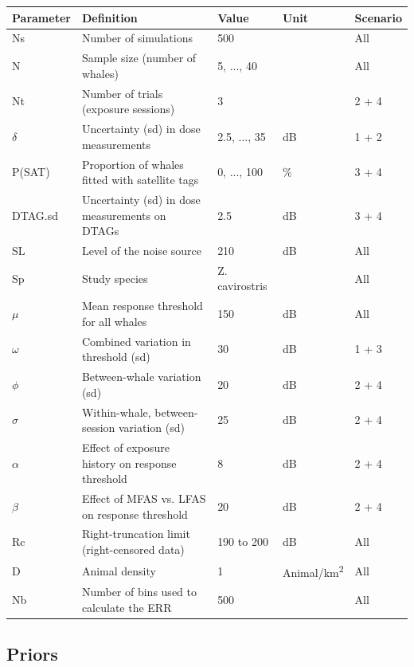 \documentclass[
]{article}
\begin{document}
\renewcommand{\arraystretch}{1.5}
\begin{table}[H]
\centering
\begin{tabular}{lllll}
\toprule
\textbf{Parameter} & \textbf{Definition} & \textbf{Value} & \textbf{Unit} & \textbf{Scenario}\\
\midrule
\rowcolor{gray!6}  Ns & Number of simulations & 500 &  & All\\
N & Sample size (number of whales) & 5, ..., 40 &  & All\\
\rowcolor{gray!6}  Nt & Number of trials (exposure sessions) & 3 &  & 2 + 4\\
$\delta$ & Uncertainty (sd) in dose measurements & 2.5, ..., 35 & dB & 1 + 2\\
\rowcolor{gray!6}  P(SAT) & Proportion of whales fitted with satellite tags & 0, ..., 100 & \% & 3 + 4\\
DTAG.sd & Uncertainty (sd) in dose measurements on DTAGs & 2.5 & dB & 3 + 4\\
\rowcolor{gray!6}  SL & Level of the noise source & 210 & dB & All\\
Sp & Study species & Z. cavirostris &  & All\\
\rowcolor{gray!6}  $\mu$ & Mean response threshold for all whales & 150 & dB & All\\
$\omega$ & Combined variation in threshold (sd) & 30 & dB & 1 + 3\\
\rowcolor{gray!6}  $\phi$ & Between-whale variation (sd) & 20 & dB & 2 + 4\\
$\sigma$ & Within-whale, between-session variation (sd) & 25 & dB & 2 + 4\\
\rowcolor{gray!6}  $\alpha$ & Effect of exposure history on response threshold & 8 & dB & 2 + 4\\
$\beta$ & Effect of MFAS vs. LFAS on response threshold & 20 & dB & 2 + 4\\
\rowcolor{gray!6}  Rc & Right-truncation limit (right-censored data) & 190 to 200 & dB & All\\
D & Animal density & 1 & Animal/km\textsuperscript{2} & All\\
\rowcolor{gray!6}  Nb & Number of bins used to calculate the ERR & 500 &  & All\\
\bottomrule
\end{tabular}
\end{table}

\subsection{Priors}
\end{document}
